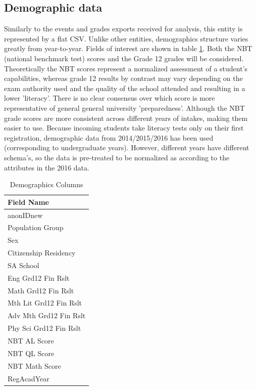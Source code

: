 \subsection{Demographic data}
Similarly to the events and grades exports received for analysis, this entity is represented by a flat CSV. Unlike other entities, demographics structure varies greatly from year-to-year. Fields of interest are shown in table \ref{Demographics Columns}. Both the NBT (national benchmark test) scores and the Grade 12 grades will be considered. Theoretically the NBT scores represent a normalized assessment of a student's capabilities, whereas grade 12 results by contrast may vary depending on the exam authority used and the quality of the school attended and resulting in a lower 'literacy'. There is no clear consensus over which score is more representative of general general university 'preparedness'. Although the NBT grade scores are more consistent across different years of intakes, making them easier to use. Because incoming students take literacy tests only on their first registration, demographic data from 2014/2015/2016 has been used (corresponding to undergraduate years). However, different years have different schema's, so the data is pre-treated to be normalized as according to the attributes in the 2016 data.

\begin{table}[]
  \centering
  \caption{Demographics Columns}
  \label{Demographics Columns}
  \begin{tabular}{l}
    Field Name             \\ \hline
    anonIDnew              \\
    Population Group       \\
    Sex                    \\
    Citizenship Residency  \\
    SA School              \\
    Eng Grd12 Fin Rslt     \\
    Math Grd12 Fin Rslt    \\
    Mth Lit Grd12 Fin Rslt \\
    Adv Mth Grd12 Fin Rslt \\
    Phy Sci Grd12 Fin Rslt \\
    NBT AL Score           \\
    NBT QL Score           \\
    NBT Math Score         \\
    RegAcadYear            \\ \hline
  \end{tabular}
\end{table}

